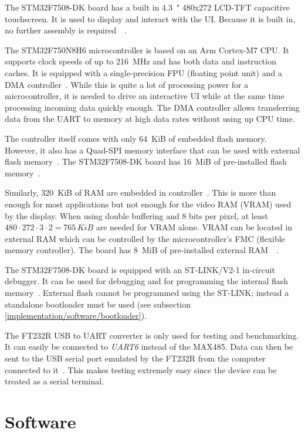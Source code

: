 The STM32F7508-DK board has a built in \SI{4.3}{"} 480x272 LCD-TFT capacitive touchscreen. It is
used to display and interact with the UI. Because it is built in, no further assembly is required~\
\cite{board-user-manual}.

The STM32F750N8H6 microcontroller is based on an Arm Cortex-M7 CPU. It supports clock speeds of up to
\SI{216}{\mega\hertz} and has both data and instruction caches. It is equipped with a single-precision
FPU (floating point unit) and a DMA controller~\cite{mcu-datasheet}. While this is quite a lot of
processing power for a microcontroller, it is needed to drive an interactive UI while at the same time
processing incoming data quickly enough. The DMA controller allows transferring data from the UART to
memory at high data rates without using up CPU time.

The controller itself comes with only \SI{64}{KiB} of embedded flash memory. However, it also has a
Quad-SPI memory interface that can be used with external flash memory~\cite{mcu-datasheet}. The
STM32F7508-DK board has \SI{16}{MiB} of pre-installed flash memory~\cite{board-user-manual}.

Similarly, \SI{320}{KiB} of RAM are embedded in controller~\cite{mcu-datasheet}. This is more than
enough for most applications but not enough for the video RAM (VRAM) used by the display. When using
double buffering and 8 bits per pixel, at least $480 \cdot 272 \cdot 3 \cdot 2 = 765\,\si{KiB}$ are
needed for VRAM alone. VRAM can be located in external RAM which can be controlled by the microcontroller's
FMC (flexible memory controller). The board has \SI{8}{MiB} of pre-installed external RAM~\
\cite{mcu-datasheet}\cite{board-user-manual}.

The STM32F7508-DK board is equipped with an ST-LINK/V2-1 in-circuit debugger. It can be used for
debugging and for programming the internal flash memory~\cite{board-user-manual}. External flash
cannot be programmed using the ST-LINK; instead a standalone bootloader must be used (see subsection
\ref{implementation/software/bootloader}).

The FT232R USB to UART converter is only used for testing and benchmarking. It can easily be connected
to \textit{UART6} instead of the MAX485. Data can then be sent to the USB serial port emulated by
the FT232R from the computer connected to it~\cite{ftdi-232r-datasheet}. This makes testing extremely
easy since the device can be treated as a serial terminal.

\section{Software}
\label{implementation/software}


